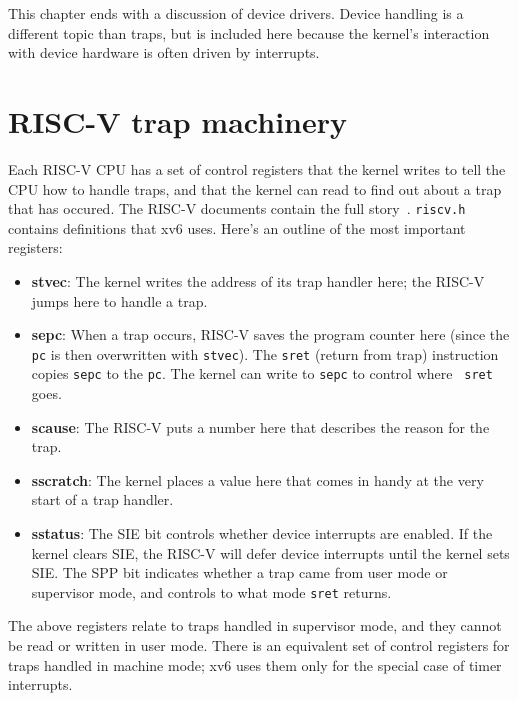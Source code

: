 This chapter ends with a discussion of device drivers. Device handling
is a different topic than traps, but is included here because the
kernel's interaction with device hardware is often driven by
interrupts.

\section{RISC-V trap machinery}

Each RISC-V CPU has a set of control registers that the kernel writes to
tell the CPU how to handle traps, and that the kernel can read
to find out about a trap that has occured. The RISC-V documents
contain the full story~\cite{riscv:priv}. {\tt riscv.h}
 contains definitions that xv6 uses. Here's
an outline of the most important registers:

\begin{itemize}

\item {\bf stvec}: The kernel writes the address of its trap handler
  here; the RISC-V jumps here to handle a trap.

\item {\bf sepc}: When a trap occurs, RISC-V saves the program counter
  here (since the {\tt pc} is then overwritten with {\tt stvec}). The
  {\tt sret} (return from trap) instruction copies {\tt sepc} to the
  {\tt pc}. The kernel can write to {\tt sepc} to control where {\tt
    sret} goes.

\item {\bf scause}: The RISC-V puts a number here that describes
the reason for the trap.

\item {\bf sscratch}: The kernel places a value here that comes in
  handy at the very start of a trap handler.

\item {\bf sstatus}: The SIE bit controls whether device interrupts
  are enabled. If the kernel clears SIE, the RISC-V will defer
  device interrupts until the kernel sets SIE. The SPP bit
  indicates whether a trap came from user mode or supervisor
  mode, and controls to what mode {\tt sret} returns.

\end{itemize}

The above registers relate to traps handled in supervisor mode, and they
cannot be read or written in user mode. There is an equivalent set of
control registers for traps handled in machine mode; xv6 uses
them only for the special case of timer interrupts.


